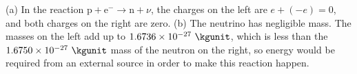 (a) In the reaction $\text{p}+\text{e}^- \rightarrow  \text{n}+\nu $, the charges on the
left are $e+(-e)=0$, and both charges on the right are zero.
(b) The neutrino has negligible mass. The masses on the left
add up to $1.6736\times10^{-27}\ \kgunit$, which is less than the
$1.6750\times10^{-27}\ \kgunit$ mass of the neutron on the right,
so energy would be required from an external source in order
to make this reaction happen.
